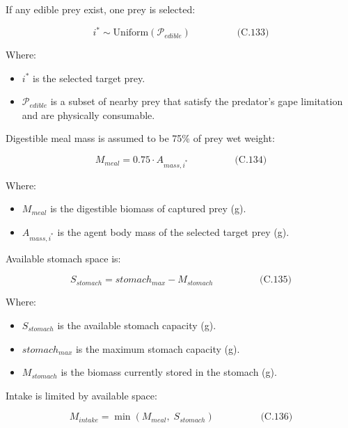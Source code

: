 \documentclass[
]{book}
\providecommand{\tightlist}{%
  \setlength{\itemsep}{0pt}\setlength{\parskip}{0pt}}
\begin{document}
If any edible prey exist, one prey is selected:

\[
\begin{equation} i^* \sim \text{Uniform}(\mathcal{P}_{edible})  \hspace{2cm} \text{(C.133)} \end{equation}
\]

Where:

\begin{itemize}
\tightlist
\item
  \(i^*\) is the selected target prey.
\item
  \(\mathcal{P}_{edible}\) is a subset of nearby prey that satisfy the
  predator's gape limitation and are physically consumable.
\end{itemize}

Digestible meal mass is assumed to be 75\% of prey wet weight:

\[
\begin{equation} M_{meal} = 0.75 \cdot A_{mass,i^*}  \hspace{2cm} \text{(C.134)} \end{equation}
\]

Where:

\begin{itemize}
\tightlist
\item
  \(M_{meal}\) is the digestible biomass of captured prey (g).
\item
  \(A_{mass,i^*}\) is the agent body mass of the selected target prey
  (g).
\end{itemize}

Available stomach space is:

\[
\begin{equation} S_{stomach} = stomach_{max} - M_{stomach}  \hspace{2cm} \text{(C.135)} \end{equation}
\]

Where:

\begin{itemize}
\tightlist
\item
  \(S_{stomach}\) is the available stomach capacity (g).
\item
  \(stomach_{max}\) is the maximum stomach capacity (g).
\item
  \(M_{stomach}\) is the biomass currently stored in the stomach (g).
\end{itemize}

Intake is limited by available space:

\[
\begin{equation} M_{intake} = \min(M_{meal},\; S_{stomach})  \hspace{2cm} \text{(C.136)} \end{equation}
\]
\end{document}
